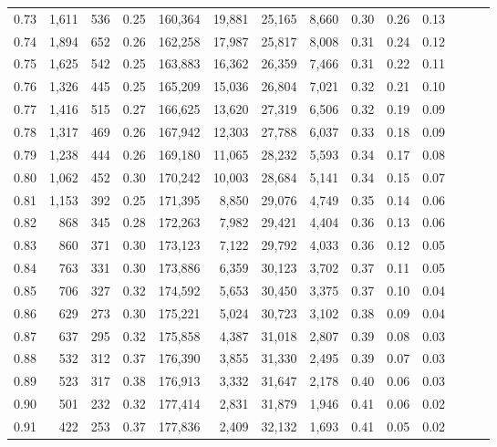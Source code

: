 \begin{tabular}{rrrrrrrrrrrrrr}
0.73 &  1,611 &  536 &  0.25 &  160,364 &   19,881 &  25,165 &   8,660 &  0.30 &  0.26 &      0.13 \\
0.74 &  1,894 &  652 &  0.26 &  162,258 &   17,987 &  25,817 &   8,008 &  0.31 &  0.24 &      0.12 \\
0.75 &  1,625 &  542 &  0.25 &  163,883 &   16,362 &  26,359 &   7,466 &  0.31 &  0.22 &      0.11 \\
0.76 &  1,326 &  445 &  0.25 &  165,209 &   15,036 &  26,804 &   7,021 &  0.32 &  0.21 &      0.10 \\
0.77 &  1,416 &  515 &  0.27 &  166,625 &   13,620 &  27,319 &   6,506 &  0.32 &  0.19 &      0.09 \\
0.78 &  1,317 &  469 &  0.26 &  167,942 &   12,303 &  27,788 &   6,037 &  0.33 &  0.18 &      0.09 \\
0.79 &  1,238 &  444 &  0.26 &  169,180 &   11,065 &  28,232 &   5,593 &  0.34 &  0.17 &      0.08 \\
0.80 &  1,062 &  452 &  0.30 &  170,242 &   10,003 &  28,684 &   5,141 &  0.34 &  0.15 &      0.07 \\
0.81 &  1,153 &  392 &  0.25 &  171,395 &    8,850 &  29,076 &   4,749 &  0.35 &  0.14 &      0.06 \\
0.82 &    868 &  345 &  0.28 &  172,263 &    7,982 &  29,421 &   4,404 &  0.36 &  0.13 &      0.06 \\
0.83 &    860 &  371 &  0.30 &  173,123 &    7,122 &  29,792 &   4,033 &  0.36 &  0.12 &      0.05 \\
0.84 &    763 &  331 &  0.30 &  173,886 &    6,359 &  30,123 &   3,702 &  0.37 &  0.11 &      0.05 \\
0.85 &    706 &  327 &  0.32 &  174,592 &    5,653 &  30,450 &   3,375 &  0.37 &  0.10 &      0.04 \\
0.86 &    629 &  273 &  0.30 &  175,221 &    5,024 &  30,723 &   3,102 &  0.38 &  0.09 &      0.04 \\
0.87 &    637 &  295 &  0.32 &  175,858 &    4,387 &  31,018 &   2,807 &  0.39 &  0.08 &      0.03 \\
0.88 &    532 &  312 &  0.37 &  176,390 &    3,855 &  31,330 &   2,495 &  0.39 &  0.07 &      0.03 \\
0.89 &    523 &  317 &  0.38 &  176,913 &    3,332 &  31,647 &   2,178 &  0.40 &  0.06 &      0.03 \\
0.90 &    501 &  232 &  0.32 &  177,414 &    2,831 &  31,879 &   1,946 &  0.41 &  0.06 &      0.02 \\
0.91 &    422 &  253 &  0.37 &  177,836 &    2,409 &  32,132 &   1,693 &  0.41 &  0.05 &      0.02 \\

\end{tabular}
